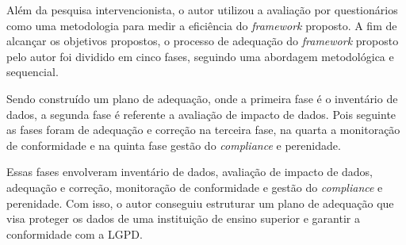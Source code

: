 \documentclass[
	12pt,				%
	openright,			%
	oneside,			%
	a4paper,			%
	english,			%
	french,				%
	spanish,			%
	brazil,				%
	]{abntex2}
\begin{document}
Além da pesquisa intervencionista, o autor utilizou a avaliação por questionários como uma metodologia para medir a eficiência do \textit{framework} proposto. A fim de alcançar os objetivos propostos, o processo de adequação do \textit{framework} proposto pelo autor foi dividido em cinco fases, seguindo uma abordagem metodológica e sequencial. 

Sendo construído um plano de adequação, onde a primeira fase é o inventário de dados, a segunda fase é referente a avaliação de impacto de dados. Pois seguinte as fases foram de adequação e correção na terceira fase, na quarta a monitoração de conformidade e na quinta fase gestão do \textit{compliance} e perenidade.

Essas fases envolveram inventário de dados, avaliação de impacto de dados, adequação e correção, monitoração de conformidade e gestão do \textit{compliance} e perenidade. Com isso, o autor conseguiu estruturar um plano de adequação que visa proteger os dados de uma instituição de ensino superior e garantir a conformidade com a LGPD.

\end{document}
